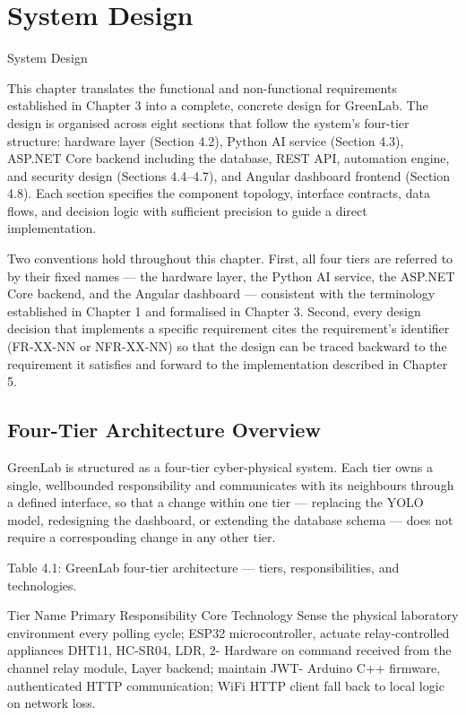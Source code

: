 
\chapter{System Design}
\label{ch:system-design}

System Design




This chapter translates the functional and non-functional requirements established in
Chapter 3 into a complete, concrete design for GreenLab. The design is organised across
eight sections that follow the system's four-tier structure: hardware layer (Section 4.2),
Python AI service (Section 4.3), ASP.NET Core backend including the database, REST API,
automation engine, and security design (Sections 4.4--4.7), and Angular dashboard
frontend (Section 4.8). Each section specifies the component topology, interface contracts,
data flows, and decision logic with sufficient precision to guide a direct implementation.

Two conventions hold throughout this chapter. First, all four tiers are referred to by their
fixed names --- the hardware layer, the Python AI service, the ASP.NET Core backend,
and the Angular dashboard --- consistent with the terminology established in Chapter 1
and formalised in Chapter 3. Second, every design decision that implements a specific
requirement cites the requirement's identifier (FR-XX-NN or NFR-XX-NN) so that the
design can be traced backward to the requirement it satisfies and forward to the
implementation described in Chapter 5.


\section{Four-Tier Architecture Overview}


GreenLab is structured as a four-tier cyber-physical system. Each tier owns a single, wellbounded responsibility and communicates with its neighbours through a defined
interface, so that a change within one tier --- replacing the YOLO model, redesigning the
dashboard, or extending the database schema --- does not require a corresponding
change in any other tier.

Table 4.1: GreenLab four-tier architecture --- tiers, responsibilities, and technologies.

Tier Name Primary Responsibility Core Technology
Sense the physical laboratory
environment every polling cycle;
ESP32 microcontroller,
actuate relay-controlled appliances
DHT11, HC-SR04, LDR, 2-
Hardware on command received from the
channel relay module,
Layer backend; maintain JWT-
Arduino C++ firmware,
authenticated HTTP communication;
WiFi HTTP client
fall back to local logic on network
loss.




